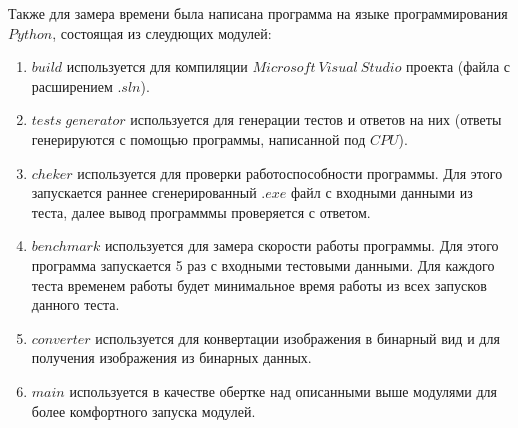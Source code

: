 Также для замера времени была написана программа на языке программирования $Python$, состоящая из слеудющих модулей:
\begin{enumerate}
    \item $build$ используется для компиляции $Microsoft\:Visual\:Studio$ проекта (файла с расширением $.sln$).
    \item $tests \; generator$ используется для генерации тестов и ответов на них (ответы генерируются с помощью программы, написанной под $CPU$).
    \item $cheker$ используется для проверки работоспособности программы.
     Для этого запускается раннее сгенерированный $.exe$ файл с входными данными из теста, далее вывод программмы проверяется с ответом.
    \item $benchmark$ используется для замера скорости работы программы. Для этого программа запускается 5 раз с входными тестовыми данными.
     Для каждого теста временем работы будет минимальное время работы из всех запусков данного теста.
    \item $converter$ используется для конвертации изображения в бинарный вид и для получения изображения из бинарных данных.
    \item $main$ используется в качестве обертке над описанными выше модулями для более комфортного запуска модулей.
\end{enumerate}